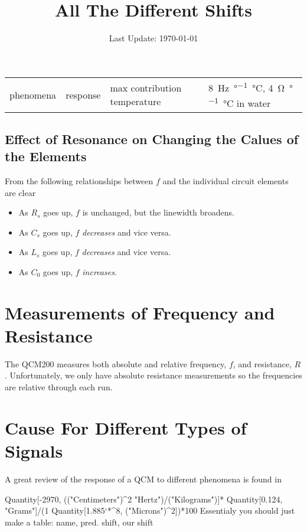 \documentclass[a4paper]{article}
\begin{document}
\title{All The Different Shifts}
\date{Last Update: \today}
\maketitle
\tableofcontents

\begin{table}
 \begin{tabularx}{\textwidth}{ll}
  \toprule
  phenomena & response & max contribution
  \midrule
  temperature &
   \SI{8}{\hertz\per\degree\celsius}, \SI{4}{\ohm\per\degree\celsius} in water\cite{srsqcm}
  \bottomrule
 \end{tabularx}
\end{table}

\subsection{Effect of Resonance on Changing the Calues of the Elements}
From  the following relationships between $f$ and
the individual circuit elements are clear
\begin{itemize}
 \item As $R_s$ goes up, $f$ is unchanged, but the linewidth broadens.
 \item As $C_s$ goes up, $f$ \textit{decreases} and vice versa.
 \item As $L_s$ goes up, $f$ \textit{decreases} and vice versa.
 \item As $C_0$ goes up, $f$ \textit{increases}.
\end{itemize}

\section{Measurements of Frequency and Resistance}
The QCM200 measures both absolute and relative frequency, $f$, and
resistance, $R$.  Unfortunately, we only have absolute resistance
measurements so the frequencies are relative through each run.

\section{Cause For Different Types of Signals}
A great review of the response of a QCM to different phenomena is found in \cite{walls1995fundamental}

Quantity[-2970, (("Centimeters")^2 "Hertz")/("Kilograms")]*
 Quantity[0.124, "Grams"]/(1 Quantity[1.885`*^8, ("Microns")^2])*100
Essentialy you should just make a table: name, pred. shift, our shift
\end{document}
